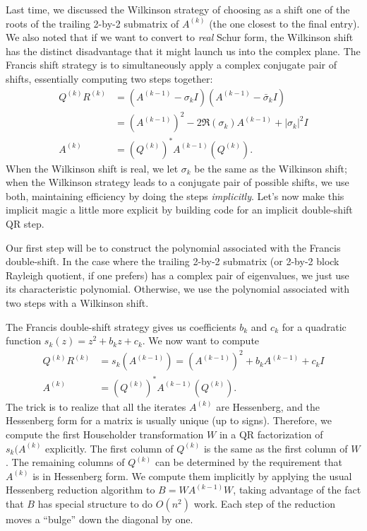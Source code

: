 \documentclass[12pt, leqno]{article} %
\begin{document}
Last time, we discussed the Wilkinson strategy of choosing as a shift
one of the roots of the trailing 2-by-2 submatrix of $A^{(k)}$ (the
one closest to the final entry).  We also noted that if we want to
convert to {\em real} Schur form, the Wilkinson shift has the distinct
disadvantage that it might launch us into the complex plane.  The
Francis shift strategy is to simultaneously apply a complex conjugate
pair of shifts, essentially computing two steps together:
\begin{align*}
  Q^{(k)} R^{(k)} &= (A^{(k-1)}-\sigma_k I)(A^{(k-1)}-\bar{\sigma}_k I) \\
                &= (A^{(k-1)})^2 - 2\Re(\sigma_k) A^{(k-1)} + |\sigma_k|^2 I \\
  A^{(k)}        &= (Q^{(k)})^* A^{(k-1)} (Q^{(k)}).
\end{align*}
When the Wilkinson shift is real, we let $\sigma_k$ be the same as the
Wilkinson shift; when the Wilkinson strategy leads to a conjugate pair
of possible shifts, we use both, maintaining efficiency by doing the
steps {\em implicitly}.  Let's now make this implicit magic a little
more explicit by building code for an implicit double-shift QR step.

Our first step will be to construct the polynomial associated with the
Francis double-shift.  In the case where the trailing 2-by-2 submatrix
(or 2-by-2 block Rayleigh quotient, if one prefers) has a complex pair
of eigenvalues, we just use its characteristic polynomial.  Otherwise,
we use the polynomial associated with two steps with a Wilkinson shift.

%

The Francis double-shift strategy gives us coefficients $b_k$ and $c_k$ for a
quadratic function $s_k(z) = z^2 + b_k z + c_k$.  We now want to compute
\begin{align*}
  Q^{(k)} R^{(k)} &= s_k(A^{(k-1)}) = (A^{(k-1)})^2 + b_k A^{(k-1)} + c_k I \\
  A^{(k)}        &= (Q^{(k)})^* A^{(k-1)} (Q^{(k)}).
\end{align*}
The trick is to realize that all the iterates $A^{(k)}$ are Hessenberg,
and the Hessenberg form for a matrix is usually unique (up to signs).
Therefore, we compute the first Householder transformation $W$ in a
QR factorization of $s_k(A^{(k)}$ explicitly.  The first column of $Q^{(k)}$
is the same as the first column of $W$.  The remaining columns of $Q^{(k)}$
can be determined by the requirement that $A^{(k)}$ is in Hessenberg form.
We compute them implicitly by applying the usual Hessenberg reduction algorithm
to $B = WA^{(k-1)}W$, taking advantage of the fact that $B$ has special
structure to do $O(n^2)$ work.  Each step of the reduction moves a ``bulge''
down the diagonal by one.
\end{document}
